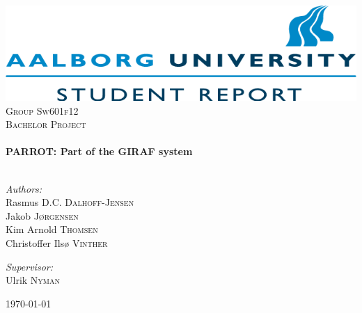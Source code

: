 \begin{nopagebreak}

\begin{center}

\includegraphics[width=\textwidth]{input/Images/aaulogo_study2}\\[1cm]    

\textsc{\LARGE Group Sw601f12}\\[1.5cm]

\textsc{\Large Bachelor Project}\\[0.5cm]


\HRule \\[0.4cm]
{ \huge \bfseries PARROT: Part of the GIRAF system}\\[0.4cm]

\HRule \\[1.5cm]

\begin{minipage}{0.4\textwidth}
\begin{flushleft} \large
\vspace{1.25cm}
\emph{Authors:}\\
Rasmus D.C. \textsc{Dalhoff-Jensen} \\
Jakob \textsc{J\o{}rgensen} \\
Kim Arnold \textsc{Thomsen}\\
Christoffer Ils\o{} \textsc{Vinther}

\end{flushleft}
\end{minipage}
\begin{minipage}{0.4\textwidth}
\begin{flushright} \large
\emph{Supervisor:} \\
Ulrik \textsc{Nyman}
\end{flushright}
\end{minipage}

\vfill

{\large \today}

\end{center}

\end{nopagebreak}

